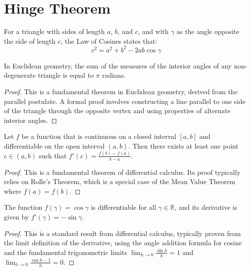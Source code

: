 \chapter{Hinge Theorem}

\begin{definition}
    \label{def:Law_of_Cosines}
    For a triangle with sides of length $a$, $b$, and $c$, and with $\gamma$ as the angle opposite the side of length $c$, the Law of Cosines states that:
    $$c^2 = a^2 + b^2 - 2ab \cos \gamma$$
\end{definition}

\begin{lemma}
    \label{lem:Triangle_Angle_Sum}
    In Euclidean geometry, the sum of the measures of the interior angles of any non-degenerate triangle is equal to $\pi$ radians.
\end{lemma}

\begin{proof}
    This is a fundamental theorem in Euclidean geometry, derived from the parallel postulate. A formal proof involves constructing a line parallel to one side of the triangle through the opposite vertex and using properties of alternate interior angles.
\end{proof}

\begin{lemma}
    \label{lem:Mean_Value_Theorem}
    Let $f$ be a function that is continuous on a closed interval $[a, b]$ and differentiable on the open interval $(a, b)$. Then there exists at least one point $c \in (a, b)$ such that $f'(c) = \frac{f(b) - f(a)}{b - a}$.
\end{lemma}

\begin{proof}
    This is a fundamental theorem of differential calculus. Its proof typically relies on Rolle's Theorem, which is a special case of the Mean Value Theorem where $f(a) = f(b)$.
\end{proof}

\begin{lemma}
    \label{lem:Derivative_of_Cosine}
    The function $f(\gamma) = \cos \gamma$ is differentiable for all $\gamma \in \mathbb{R}$, and its derivative is given by $f'(\gamma) = -\sin \gamma$.
\end{lemma}

\begin{proof}
    This is a standard result from differential calculus, typically proven from the limit definition of the derivative, using the angle addition formula for cosine and the fundamental trigonometric limits $\lim_{h\to 0} \frac{\sin h}{h} = 1$ and $\lim_{h\to 0} \frac{\cos h - 1}{h} = 0$.
\end{proof}

